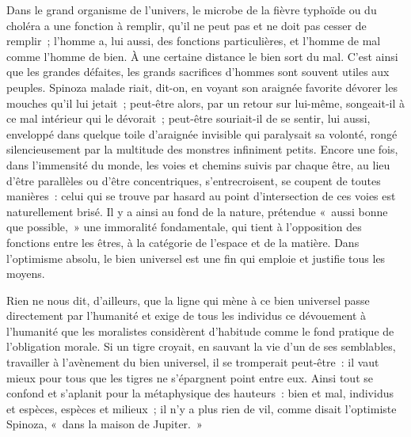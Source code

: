 \documentclass[french,twoside]{book} %
\begin{document}
Dans le grand organisme de l’univers, le microbe de la fièvre typhoïde ou du choléra a une fonction à remplir, qu’il ne peut pas et ne doit pas cesser de remplir ; l’homme a, lui aussi, des fonctions particulières, et l’homme de mal comme l’homme de bien. À une certaine distance le bien sort du mal. C’est ainsi que les grandes défaites, les grands sacrifices d’hommes sont souvent utiles aux peuples. Spinoza malade riait, dit-on, en voyant son araignée favorite dévorer les mouches qu’il lui jetait ; peut-être alors, par un retour sur lui-même, songeait-il à ce mal intérieur qui le dévorait ; peut-être souriait-il de se sentir, lui aussi, enveloppé dans quelque toile d’araignée invisible qui paralysait sa volonté, rongé silencieusement par la multitude des monstres infiniment petits. Encore une fois, dans l’immensité du monde, les voies et chemins suivis par chaque être, au lieu d’être parallèles ou d’être concentriques, s’entrecroisent, se coupent de toutes manières : celui qui se trouve par hasard au point d’intersection de ces voies est naturellement brisé. Il y a ainsi au fond de la nature, prétendue « aussi bonne que possible, » une immoralité fondamentale, qui tient à l’opposition des fonctions entre les êtres, à la catégorie de l’espace et de la matière. Dans l’optimisme absolu, le bien universel est une fin qui emploie et justifie tous les moyens.\par
Rien ne nous dit, d’ailleurs, que la ligne qui mène à ce bien universel passe directement par l’humanité et exige de tous les individus ce dévouement à l’humanité que les moralistes considèrent d’habitude comme le fond pratique de l’obligation morale. Si un tigre croyait, en sauvant la vie d’un de ses semblables, travailler à l’avènement du bien universel, il se tromperait peut-être : il vaut mieux pour tous que les tigres ne s’épargnent point entre eux. Ainsi tout se confond et s’aplanit pour la métaphysique des hauteurs : bien et mal, individus et espèces, espèces et milieux ; il n’y a plus rien de vil, comme disait l’optimiste Spinoza, « dans la maison de Jupiter. »\par
\end{document}
